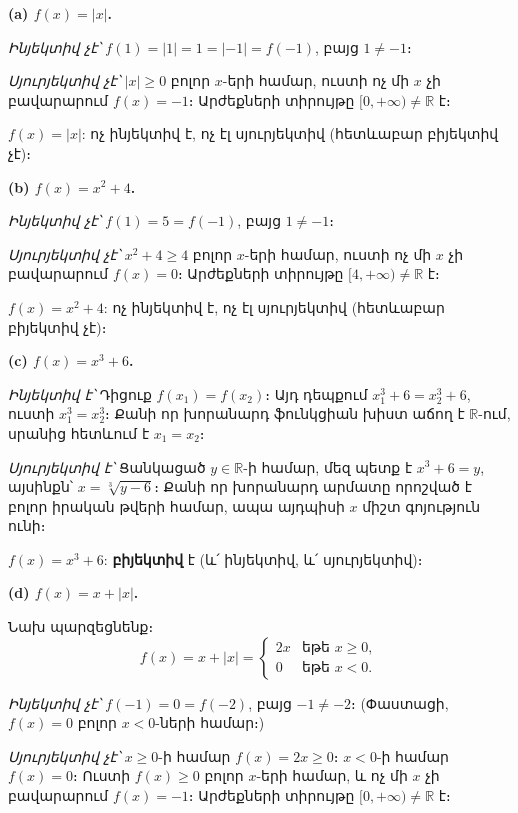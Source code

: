 \documentclass[12pt, a4paper]{article}
\newcommand{\R}{\mathbb{R}}
\begin{document}
\medskip

\textbf{(a)\; $f(x) = |x|$.}

\emph{Ինյեկտիվ չէ՝}\; $f(1) = |1| = 1 = |-1| = f(-1)$, բայց $1 \neq -1$։

\emph{Սյուրյեկտիվ չէ՝}\; $|x| \ge 0$ բոլոր $x$-երի համար, ուստի ոչ մի $x$ չի բավարարում $f(x) = -1$։
Արժեքների տիրույթը $[0, +\infty) \neq \R$ է։

\begin{answerbox}
$f(x) = |x|$: ոչ ինյեկտիվ է, ոչ էլ սյուրյեկտիվ (հետևաբար բիյեկտիվ չէ)։
\end{answerbox}

\bigskip
\textbf{(b)\; $f(x) = x^2 + 4$.}

\emph{Ինյեկտիվ չէ՝}\; $f(1) = 5 = f(-1)$, բայց $1 \neq -1$։

\emph{Սյուրյեկտիվ չէ՝}\; $x^2 + 4 \ge 4$ բոլոր $x$-երի համար, ուստի ոչ մի $x$ չի բավարարում $f(x) = 0$։
Արժեքների տիրույթը $[4, +\infty) \neq \R$ է։

\begin{answerbox}
$f(x) = x^2 + 4$: ոչ ինյեկտիվ է, ոչ էլ սյուրյեկտիվ (հետևաբար բիյեկտիվ չէ)։
\end{answerbox}

\bigskip
\textbf{(c)\; $f(x) = x^3 + 6$.}

\emph{Ինյեկտիվ է՝}\; Դիցուք $f(x_1) = f(x_2)$։ Այդ դեպքում $x_1^3 + 6 = x_2^3 + 6$,
ուստի $x_1^3 = x_2^3$։ Քանի որ խորանարդ ֆունկցիան խիստ աճող է $\R$-ում,
սրանից հետևում է $x_1 = x_2$։

\emph{Սյուրյեկտիվ է՝}\; Ցանկացած $y \in \R$-ի համար, մեզ պետք է $x^3 + 6 = y$, այսինքն՝
$x = \sqrt[3]{y - 6}$։ Քանի որ խորանարդ արմատը որոշված է բոլոր իրական թվերի համար, ապա
այդպիսի $x$ միշտ գոյություն ունի։

\begin{answerbox}
$f(x) = x^3 + 6$: \textbf{բիյեկտիվ} է (և՛ ինյեկտիվ, և՛ սյուրյեկտիվ)։
\end{answerbox}

\bigskip
\textbf{(d)\; $f(x) = x + |x|$.}

Նախ պարզեցնենք։
\[
  f(x) = x + |x| = \begin{cases} 2x & \text{եթե } x \ge 0, \\ 0 & \text{եթե } x < 0. \end{cases}
\]

\emph{Ինյեկտիվ չէ՝}\; $f(-1) = 0 = f(-2)$, բայց $-1 \neq -2$։
(Փաստացի, $f(x) = 0$ բոլոր $x < 0$-ների համար։)

\emph{Սյուրյեկտիվ չէ՝}\; $x \ge 0$-ի համար $f(x) = 2x \ge 0$։
$x < 0$-ի համար $f(x) = 0$։ Ուստի $f(x) \ge 0$ բոլոր $x$-երի համար,
և ոչ մի $x$ չի բավարարում $f(x) = -1$։ Արժեքների տիրույթը $[0, +\infty) \neq \R$ է։
\end{document}
